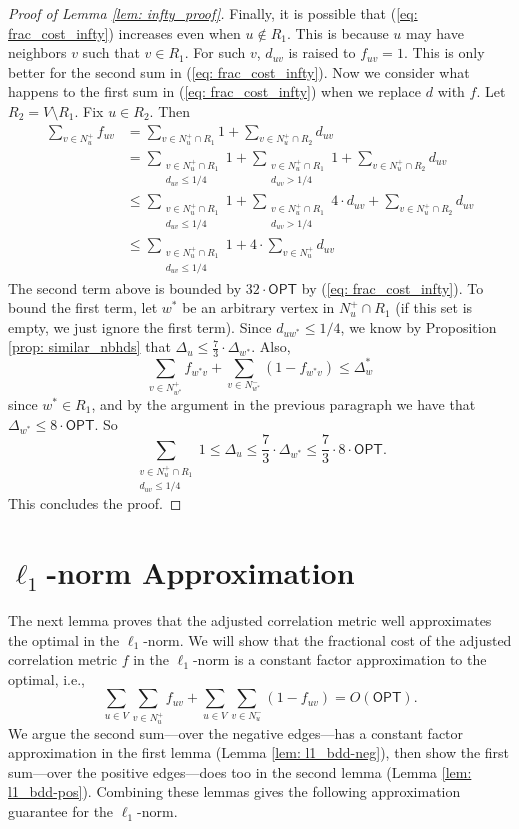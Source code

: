 \documentclass[11pt]{article}
\begin{document}
\begin{proof}[Proof of Lemma \ref{lem: infty_proof}]
Finally, it is possible that (\ref{eq: frac_cost_infty}) increases even when $u \not \in R_1$. This is because $u$ may have neighbors $v$ such that $v \in R_1$. For such $v$, $d_{uv}$ is raised to $f_{uv}=1$. This is only better for the second sum in (\ref{eq: frac_cost_infty}). Now we consider what happens to the first sum in (\ref{eq: frac_cost_infty}) when we replace $d$ with $f$. Let $R_2 = V \setminus R_1$. Fix $u \in R_2$. Then
\begin{align*}
    \sum_{v \in N_u^+} f_{uv} &= \sum_{v \in N_u^+ \cap R_1} 1 + \sum_{v \in N_u^+ \cap R_2} d_{uv} \\
    &= \sum_{\substack{v \in N_u^+ \cap R_1 \\ d_{uv} \leq 1/4}} 1 + \sum_{\substack{v \in N_u^+ \cap R_1 \\ d_{uv} > 1/4}} 1 + \sum_{v \in N_u^+ \cap R_2} d_{uv} \\
    &\leq \sum_{\substack{v \in N_u^+ \cap R_1 \\ d_{uv} \leq 1/4}} 1 + \sum_{\substack{v \in N_u^+ \cap R_1 \\ d_{uv} > 1/4}} 4 \cdot d_{uv} + \sum_{v \in N_u^+ \cap R_2} d_{uv} \\
    &\leq \sum_{\substack{v \in N_u^+ \cap R_1 \\ d_{uv} \leq 1/4}} 1 + 4 \cdot \sum_{v \in N_u^+} d_{uv}
\end{align*}
The second term above is bounded by $32 \cdot \textsf{OPT}$ by (\ref{eq: frac_cost_infty}). To bound the first term, let $w^*$ be an arbitrary vertex in $N_u^+ \cap R_1$ (if this set is empty, we just ignore the first term). Since $d_{uw^*} \leq 1/4$, we know by Proposition \ref{prop: similar_nbhds} that $\Delta_u \leq \frac{7}{3} \cdot \Delta_{w^*}$. Also, 
$$ \sum_{v \in N_{w^*}^+} f_{w^*v} + \sum_{v \in N_{w^*}^-} (1-f_{w^*v})  \leq \Delta_w^*$$ 
since $w^* \in R_1$, and by the argument in the previous paragraph we have that $\Delta_{w^*} \leq 8 \cdot \textsf{OPT}$. So
\[\sum_{\substack{v \in N_u^+ \cap R_1 \\ d_{uv} \leq 1/4}} 1 \leq \Delta_u \leq \frac{7}{3} \cdot \Delta_{w^*} \leq \frac{7}{3} \cdot 8 \cdot \textsf{OPT}.\] This concludes the proof. 
\end{proof}
  

\section{$\ell_1$-norm Approximation}\label{sec:l1-norm}
The next lemma proves that the adjusted correlation metric well approximates the optimal in the $\ell_1$-norm.
We will show that the fractional cost of the adjusted correlation metric $f$ in the $\ell_1$-norm is a constant factor approximation to the optimal, i.e., 
    $$\sum_{u \in V} \sum_{v \in N_u^+} f_{uv} + \sum_{u \in V} \sum_{v \in N_u^-} (1-f_{uv}) = O(\textsf{OPT}).$$
We argue the second sum---over the negative edges---has a constant factor approximation in the first lemma (Lemma \ref{lem: l1_bdd-neg}), then show the first sum---over the positive edges---does too in the second lemma (Lemma \ref{lem: l1_bdd-pos}). 
Combining these lemmas gives the following approximation guarantee for the $\ell_1$-norm.
\end{document}
